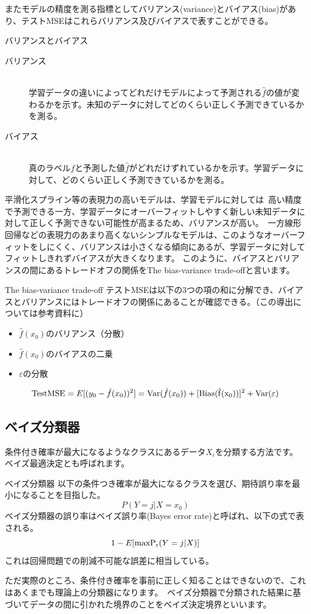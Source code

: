 \documentclass[uplatex]{jsarticle}
\begin{document}
またモデルの精度を測る指標としてバリアンス(variance)とバイアス(bias)があり、テストMSEはこれらバリアンス及びバイアスで表すことができる。
\begin{itembox}[l]{バリアンスとバイアス}
  \begin{description}
    \item [バリアンス]\mbox{}\\
    学習データの違いによってどれだけモデルによって予測される$\hat{f}$の値が変わるかを示す。未知のデータに対してどのくらい正しく予測できているかを測る。
    \item [バイアス]\mbox{}\\
    真のラベル$f$と予測した値$\hat{f}$がどれだけずれているかを示す。学習データに対して、どのくらい正しく予測できているかを測る。
  \end{description}
\end{itembox}
平滑化スプライン等の表現力の高いモデルは、学習モデルに対しては\
高い精度で予測できる一方、学習データにオーバーフィットしやすく新しい未知データに対して正しく予測できない可能性が高まるため、バリアンスが高い。\
一方線形回帰などの表現力のあまり高くないシンプルなモデルは、このようなオーバーフィットをしにくく、バリアンスは小さくなる傾向にあるが、学習データに対してフィットしきれずバイアスが大きくなります。
このように、バイアスとバリアンスの間にあるトレードオフの関係をThe bias-variance trade-offと言います。
\begin{itembox}[l]{The bias-variance trade-off}
  テストMSEは以下の3つの項の和に分解でき、バイアスとバリアンスにはトレードオフの関係にあることが確認できる。（この導出については参考資料に）
  \begin{itemize}
    \item $\hat{f}(x_0)$のバリアンス（分散）
    \item $\hat{f}(x_0)$のバイアスの二乗
    \item $\varepsilon$の分散
  \end{itemize}
  $${\rm Test MSE} = E[(y_0 - \hat{f}(x_0))^2] = {\rm Var}(\hat{f}(x_0)) + [{\rm Bias (\hat{f}(x_0))}]^2 + {\rm Var}(\varepsilon)$$
\end{itembox}

\subsection{ベイズ分類器}
条件付き確率が最大になるようなクラスにあるデータ$X_i$を分類する方法です。ベイズ最適決定とも呼ばれます。
\begin{itembox}[l]{ベイズ分類器}
  以下の条件つき確率が最大になるクラスを選び、期待誤り率を最小になることを目指した。
  $$P(Y = j|X = x_0)$$
  ベイズ分類器の誤り率はベイズ誤り率(Bayes error rate)と呼ばれ、以下の式で表される。\
  $$1 - E[{\rm max P_r}(Y = j|X)]$$
  これは回帰問題での削減不可能な誤差に相当している。
\end{itembox}
ただ実際のところ、条件付き確率を事前に正しく知ることはできないので、これはあくまでも理論上の分類器になります。\
ベイズ分類器で分類された結果に基づいてデータの間に引かれた境界のことをベイズ決定境界といいます。
\end{document}
